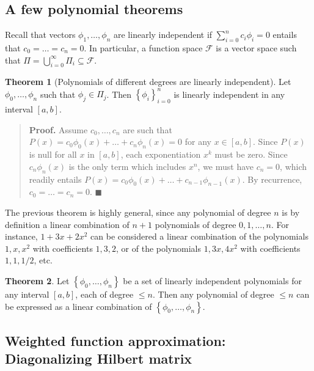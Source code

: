 \documentclass[12pt]{article}
\theoremstyle{definition}
\newtheorem{theorem}{Theorem}
\begin{document}
\subsection{A few polynomial theorems}

Recall that vectors $\phi_1, \ldots, \phi_n$ are linearly independent if
$\sum_{i=0}^n c_i \phi_i = 0$ entails that $c_0 = \ldots = c_n = 0$. In
particular, a function space $\mathcal{F}$ is a vector space 
such that $\Pi = \bigcup_{i=0}^\infty \Pi_i \subseteq \mathcal{F}$. 

\begin{theorem}[Polynomials of different degrees are linearly independent]
    Let $\phi_0, \ldots, \phi_n$ such that $\phi_j \in \Pi_j$. Then $\left\{ \phi_i
    \right\}_{i=0}^n $ is linearly independent in any interval 
    $[a, b]$.
\end{theorem}


\small
\begin{quote}

\textbf{Proof.} Assume $c_0, \ldots, c_n$ are such that $P(x) = c_0\phi_0(x) + \ldots +
c_n \phi_n(x) = 0$ for any $x \in [a, b]$.  Since $P(x)$ is null 
for all $x$ in $[a, b]$, each exponentiation $x^k$ must be zero. 
Since $c_n \phi_n(x)$ is the only term which includes $x^n$,
we must have $c_n = 0$, which readily entails $P(x) = c_0 \phi_0(x) + \ldots +
c_{n-1}\phi_{n-1}(x)$. By recurrence, $c_0 = \ldots = c_n = 0$. $\blacksquare$

\end{quote}
\normalsize

The previous theorem is highly general, since any polynomial of degree $n$ is by
definition a linear combination of $n+1$ polynomials of degree $0, 1, \ldots, n$.
For instance, $1 + 3x + 2x^2$ can be considered a linear combination of the
polynomials $1, x, x^2$ with coefficients $1, 3, 2$, or of the polynomials 
$1, 3x, 4x^2$ with coefficients $1, 1, 1 / 2$, etc.

\begin{theorem}
    Let $\left\{ \phi_0, \ldots, \phi_n \right\} $ be a set of linearly
    independent polynomials for any interval $[a, b]$, each of degree 
    $\leq n$. Then any polynomial of degree $\leq n$ can be expressed as a
    linear combination of $\left\{ \phi_0, \ldots, \phi_n \right\} $.
\end{theorem}

\subsection{Weighted function approximation: Diagonalizing Hilbert matrix}
\end{document}
